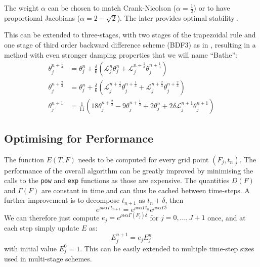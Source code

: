 \documentclass[]{rAMF2e}
\begin{document}
The weight $\alpha$ can be chosen to match Crank-Nicolson ($\alpha=\frac{1}{2}$) or to have proportional Jacobians ($\alpha = 2-\sqrt{2}$). The later provides optimal stability \citep{dharmaraja2009optimal}. 

This can be extended to three-stages, with two stages of the trapezoidal rule and one stage of third order backward difference scheme (BDF3) as in \citep{bathe2005composite}, resulting in a method with even stronger damping properties that we will name ``Bathe'':
\begin{subequations}
\begin{align}
\theta_j^{n+\frac{1}{3}} &= \theta_j^n + \frac{\delta}{6}\left(\mathcal{L}_j^{n} \theta_j^n+\mathcal{L}_j^{n+\frac{1}{3}} \theta_j^{n+\frac{1}{3}}\right)\\
\theta_j^{n+\frac{2}{3}} &= \theta_j^n + \frac{\delta}{6}\left( \mathcal{L}_j^{n+\frac{1}{3}} \theta_j^{n+\frac{1}{3}}+\mathcal{L}_j^{n+\frac{2}{3}} \theta_j^{n+\frac{2}{3}}\right)\\
\theta_j^{n+1} &= \frac{1}{11}\left( 18  \theta_j^{n+\frac{2}{3}} - 9 \theta_j^{n+\frac{1}{3}} + 2 \theta_j^n + 2\delta\mathcal{L}_j^{n+1} \theta_j^{n+1}\right)
\end{align}
\end{subequations}

\subsection{Optimising for Performance}
The function $E(T, F)$ needs to be computed for every grid point $\left(F_j, t_n\right)$. The performance of the overall algorithm can be greatly improved by minimising the calls to the \texttt{pow} and \texttt{exp} functions as those are expensive. The quantities $D(F)$ and $\Gamma(F)$ are constant in time and can thus be cached between time-steps. A further improvement is to decompose $t_{n+1}$ as $t_{n}+\delta$, then 
\begin{equation}
e^{\rho\nu\alpha\Gamma t_{n+1}}=e^{\rho\nu\alpha\Gamma t_n}e^{\rho\nu\alpha\Gamma \delta}
\end{equation}
We can therefore just compute  $e_j = e^{\rho\nu\alpha\Gamma(F_j) \delta}$ for $j=0,...,J+1$ once, and at each step simply update $E$ as:
\begin{equation}
E_j^{n+1} = e_j E_j^{n} 
\end{equation}
%
with initial value $E_j^0=1$.
This can be easily extended to multiple time-step sizes used in multi-stage schemes.
\end{document}
